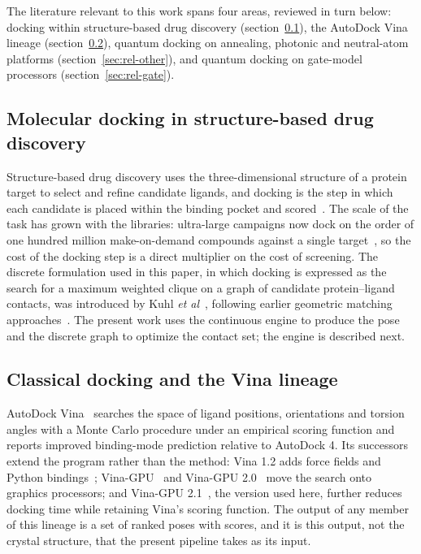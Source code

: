 \documentclass{iopjournal}
\begin{document}
The literature relevant to this work spans four areas, reviewed in turn below: docking within structure-based drug discovery (section~\ref{sec:rel-sbdd}), the AutoDock Vina lineage (section~\ref{sec:rel-vina}), quantum docking on annealing, photonic and neutral-atom platforms (section~\ref{sec:rel-other}), and quantum docking on gate-model processors (section~\ref{sec:rel-gate}).

\subsection{Molecular docking in structure-based drug discovery}
\label{sec:rel-sbdd}
Structure-based drug discovery uses the three-dimensional structure of a protein target to select and refine candidate ligands, and docking is the step in which each candidate is placed within the binding pocket and scored~\cite{trott2010vina}. The scale of the task has grown with the libraries: ultra-large campaigns now dock on the order of one hundred million make-on-demand compounds against a single target~\cite{lyu2019ultralarge}, so the cost of the docking step is a direct multiplier on the cost of screening. The discrete formulation used in this paper, in which docking is expressed as the search for a maximum weighted clique on a graph of candidate protein--ligand contacts, was introduced by Kuhl \textit{et al}~\cite{kuhl1984combinatorial}, following earlier geometric matching approaches~\cite{kuntz1982geometric}. The present work uses the continuous engine to produce the pose and the discrete graph to optimize the contact set; the engine is described next.

\subsection{Classical docking and the Vina lineage}
\label{sec:rel-vina}
AutoDock Vina~\cite{trott2010vina} searches the space of ligand positions, orientations and torsion angles with a Monte Carlo procedure under an empirical scoring function and reports improved binding-mode prediction relative to AutoDock 4. Its successors extend the program rather than the method: Vina 1.2 adds force fields and Python bindings~\cite{eberhardt2021vina12}; Vina-GPU~\cite{tang2022vinagpu} and Vina-GPU 2.0~\cite{ding2023vinagpu2} move the search onto graphics processors; and Vina-GPU 2.1~\cite{tang2024vinagpu21}, the version used here, further reduces docking time while retaining Vina's scoring function. The output of any member of this lineage is a set of ranked poses with scores, and it is this output, not the crystal structure, that the present pipeline takes as its input.
\end{document}

